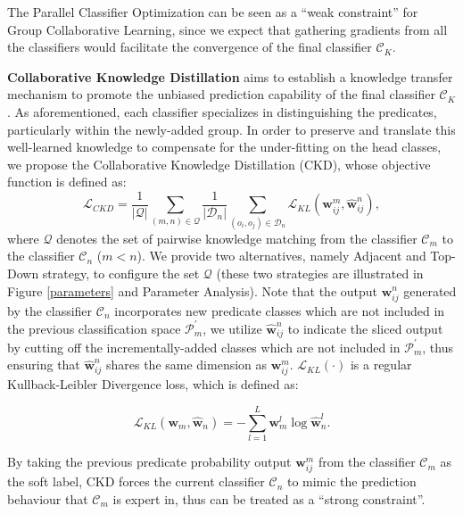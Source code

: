 \documentclass[10pt,twocolumn,letterpaper]{article}
\begin{document}
The Parallel Classifier Optimization can be seen as a ``weak constraint'' for Group Collaborative Learning, since we expect that gathering gradients from all the classifiers would facilitate the convergence of the final classifier $\mathcal{C}_{K}$.

\textbf{Collaborative Knowledge Distillation} aims to establish a knowledge transfer mechanism to promote the unbiased prediction capability of the final classifier $\mathcal{C}_{K}$. As aforementioned, each classifier specializes in distinguishing the predicates, particularly within the newly-added group. In order to preserve and translate this well-learned knowledge to compensate for the under-fitting on the head classes, we propose the Collaborative Knowledge Distillation (CKD), whose objective function is defined as:
\begin{equation}
	\mathcal{L}_{CKD}=\frac{1}{| \mathcal{Q} |} \sum_{{(m, n)} \in \mathcal{Q}}   \frac{1}{|\mathcal{D}_n|}\sum_{{(o_i,o_j)} \in \mathcal{D}_n}  \mathcal{L}_{KL} (\mathbf{w}_{ij}^{m}, \widehat{\mathbf{w}}_{ij}^{{n}}),
\end{equation}
where $\mathcal{Q}$ denotes the set of pairwise knowledge matching from the classifier $\mathcal{C}_{m}$ to the classifier $\mathcal{C}_{n}$ ($m<n$). We provide two alternatives, namely Adjacent and Top-Down strategy, to configure the set $\mathcal{Q}$ (these two strategies are illustrated in Figure \ref{parameters} and Parameter Analysis). Note that the output $\mathbf{w}_{ij}^{n}$ generated by the classifier $\mathcal{C}_{n}$ incorporates new predicate classes which are not included in the previous classification space $\mathcal{P}_{m}^{\prime}$, we utilize $\widehat{\mathbf{w}}_{ij}^{{n}}$ to indicate the sliced output by cutting off the incrementally-added classes which are not included in $\mathcal{P}_{m}^{\prime}$, thus ensuring that $\widehat{\mathbf{w}}_{ij}^{{n}}$ shares the same dimension as $\mathbf{w}_{ij}^{m}$. $\mathcal{L}_{KL}(\cdot)$ is a regular Kullback-Leibler Divergence loss, which is defined as:

\begin{equation}
	\mathcal{L}_{KL} (\mathbf{w}_{m}, \widehat{\mathbf{w}}_{n}) = - \sum_{l=1}^{L} \mathbf{w}_{m}^{l} \log \widehat{\mathbf{w}}_{n}^{l}.
\end{equation}

By taking the previous predicate probability output $\mathbf{w}_{ij}^{m}$ from the classifier $\mathcal{C}_{m}$ as the soft label, CKD forces the current classifier $\mathcal{C}_{n}$ to mimic the prediction behaviour that $\mathcal{C}_{m}$ is expert in, thus can be treated as a ``strong constraint''.
\end{document}
